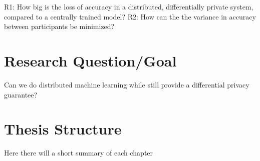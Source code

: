 R1: How big is the loss of accuracy in a distributed, differentially private system, compared to a centrally trained model?
R2: How can the the variance in accuracy between participants be minimized?



\section{Research Question/Goal}
Can we do distributed machine learning while still provide a differential privacy guarantee?


\section{Thesis Structure}
Here there will a short summary of each chapter


